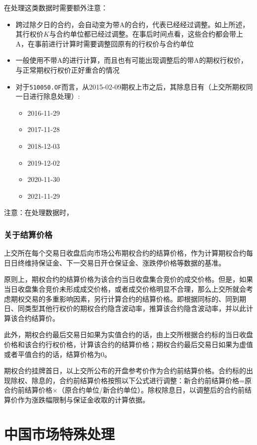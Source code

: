 \documentclass[11pt]{article}
\begin{document}
在处理这类数据时需要额外注意：
\begin{itemize}
    \item 跨过除夕日的合约，会自动变为带A的合约，代表已经经过调整。如上所述，其行权价$K$与合约单位都已经过调整。在事后时间点看，这些合约都会带上A，在事前进行计算时需要调整回原有的行权价与合约单位
    \item 一般使用不带A的进行计算，而且也有可能出现调整后的带A的期权行权价，与正常期权行权价正好重合的情况
    \item 对于\verb|510050.OF|而言，从2015-02-09期权上市之后，其除息日有（上交所期权同一日进行除息处理）:
    \begin{itemize}
        \item 2016-11-29
        \item 2017-11-28
        \item 2018-12-03
        \item 2019-12-02
        \item 2020-11-30
        \item 2021-11-29
    \end{itemize}
\end{itemize}
注意：在处理数据时，

\subsubsection*{关于结算价格}

上交所在每个交易日收盘后向市场公布期权合约的结算价格，作为计算期权合约每日日终维持保证金、下一交易日开仓保证金、涨跌停价格等数据的基准。

原则上，期权合约的结算价格为该合约当日收盘集合竞价的成交价格。但是，如果当日收盘集合竞价未形成成交价格，或者成交价格明显不合理，那么上交所就会考虑期权交易的多重影响因素，另行计算合约的结算价格。即根据同标的、同到期日、同类型其他行权价的期权合约隐含波动率，推算该合约隐含波动率，并以此计算该合约结算价。

此外，期权合约最后交易日如果为实值合约的话，由上交所根据合约标的当日收盘价格和该合约行权价格，计算该合约的结算价格；期权合约最后交易日如果为虚值或者平值合约的话，结算价格为0。

期权合约挂牌首日，以上交所公布的开盘参考价作为合约前结算价格。合约标的出现除权、除息的，合约前结算价格按照以下公式进行调整：新合约前结算价格=原合约前结算价格×（原合约单位/新合约单位）。除权除息日，以调整后的合约前结算价作为涨跌幅限制与保证金收取的计算依据。

\section{中国市场特殊处理}
\end{document}
